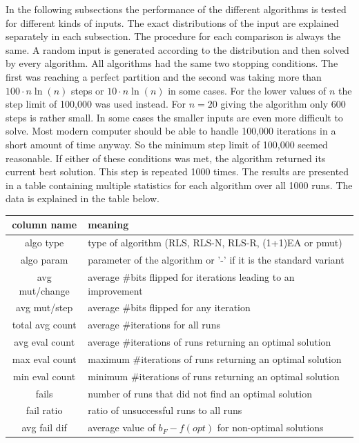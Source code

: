 In the following subsections the performance of the different algorithms is tested for different kinds of inputs.
The exact distributions of the input are explained separately in each subsection.
The procedure for each comparison is always the same. A random input is generated according to the distribution and then solved by every algorithm.
All algorithms had the same two stopping conditions.
The first was reaching a perfect partition and the second was taking more than $100 \cdot n\ln(n)$ steps or $10 \cdot n\ln(n)$ in some cases.
For the lower values of $n$ the step limit of 100,000 was used instead.
For $n=20$ giving the algorithm only 600 steps is rather small.
In some cases the smaller inputs are even more difficult to solve.
Most modern computer should be able to handle 100,000 iterations in a short amount of time anyway.
So the minimum step limit of 100,000 seemed reasonable.
If either of these conditions was met, the algorithm returned its current best solution.
This step is repeated 1000 times.
The results are presented in a table containing multiple statistics for each algorithm over all 1000 runs.
The data is explained in the table below.

\begin{tabular}{c|l}
      column name     & meaning                                                         \\ \hline
      algo type       & type of algorithm (RLS, RLS-N, RLS-R, (1+1)EA or pmut)          \\
      algo param      & parameter of the algorithm or '-' if it is the standard variant \\
      avg mut/change  & average \#bits flipped for iterations leading to an improvement \\
      avg mut/step    & average \#bits flipped for any iteration                        \\ \hline
      total avg count & average \#iterations for all runs                               \\
      avg eval count  & average \#iterations of runs returning an optimal solution      \\
      max eval count  & maximum \#iterations of runs returning an optimal solution      \\
      min eval count  & minimum \#iterations of runs returning an optimal solution      \\ \hline
      fails           & number of runs that did not find an optimal solution            \\
      fail ratio      & ratio of unsuccessful runs to all runs                          \\
      avg fail dif    & average value of $b_F-f(opt)$ for non-optimal solutions         \\
\end{tabular}


